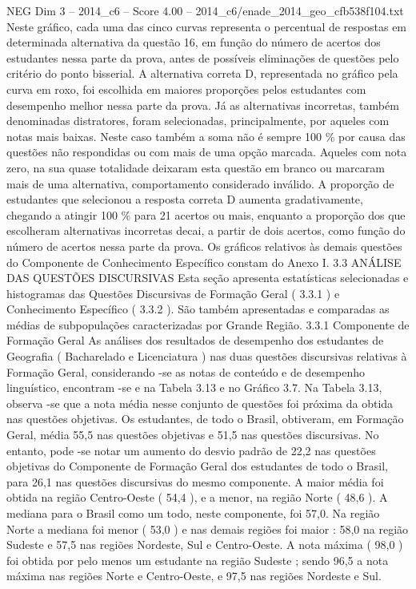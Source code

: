 \begin{textsample}{NEG Dim 3 – 2014\_c6 – Score 4.00 – 2014\_c6/enade\_2014\_geo\_cfb538f104.txt}
Neste gráfico, cada uma das cinco curvas representa o percentual de respostas em determinada alternativa da questão 16, em função do número de acertos dos estudantes nessa parte da prova, antes de possíveis eliminações de questões pelo critério do ponto bisserial.
A alternativa correta D, representada no gráfico pela curva em roxo, foi escolhida em maiores proporções pelos estudantes com desempenho melhor nessa parte da prova.
Já as alternativas incorretas, também denominadas distratores, foram selecionadas, principalmente, por aqueles com notas mais baixas.
Neste caso também a soma não é sempre 100 \% por causa das questões não respondidas ou com mais de uma opção marcada.
Aqueles com nota zero, na sua quase totalidade deixaram esta questão em branco ou marcaram mais de uma alternativa, comportamento considerado inválido.
A proporção de estudantes que selecionou a resposta correta D aumenta gradativamente, chegando a atingir 100 \% para 21 acertos ou mais, enquanto a proporção dos que escolheram alternativas incorretas decai, a partir de dois acertos, como função do número de acertos nessa parte da prova.
Os gráficos relativos às demais questões do Componente de Conhecimento Específico constam do Anexo I. 3.3 ANÁLISE DAS QUESTÕES DISCURSIVAS Esta seção apresenta estatísticas selecionadas e histogramas das Questões Discursivas de Formação Geral ( 3.3.1 ) e Conhecimento Específico ( 3.3.2 ).
São também apresentadas e comparadas as médias de subpopulações caracterizadas por Grande Região. 3.3.1 Componente de Formação Geral As análises dos resultados de desempenho dos estudantes de Geografia ( Bacharelado e Licenciatura ) nas duas questões discursivas relativas à Formação Geral, considerando -se as notas de conteúdo e de desempenho linguístico, encontram -se e na Tabela 3.13 e no Gráfico 3.7.
Na Tabela 3.13, observa -se que a nota média nesse conjunto de questões foi próxima da obtida nas questões objetivas.
Os estudantes, de todo o Brasil, obtiveram, em Formação Geral, média 55,5 nas questões objetivas e 51,5 nas questões discursivas.
No entanto, pode -se notar um aumento do desvio padrão de 22,2 nas questões objetivas do Componente de Formação Geral dos estudantes de todo o Brasil, para 26,1 nas questões discursivas do mesmo componente.
A maior média foi obtida na região Centro-Oeste ( 54,4 ), e a menor, na região Norte ( 48,6 ).
A mediana para o Brasil como um todo, neste componente, foi 57,0.
Na região Norte a mediana foi menor ( 53,0 ) e nas demais regiões foi maior : 58,0 na região Sudeste e 57,5 nas regiões Nordeste, Sul e Centro-Oeste.
A nota máxima ( 98,0 ) foi obtida por pelo menos um estudante na região Sudeste ; sendo 96,5 a nota máxima nas regiões Norte e Centro-Oeste, e 97,5 nas regiões Nordeste e Sul.

\end{textsample}
